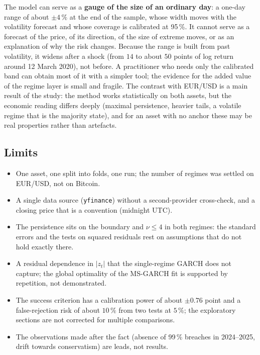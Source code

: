 \documentclass[12pt,a4paper]{article}
\begin{document}
\begin{econbox}
	The model can serve as a \textbf{gauge of the size of an ordinary day}: a one-day range of about $\pm4\,\%$ at the end of the sample, whose width moves with the volatility forecast and whose coverage is calibrated at 95\,\%. It cannot serve as a forecast of the price, of its direction, of the size of extreme moves, or as an explanation of why the risk changes. Because the range is built from past volatility, it widens after a shock (from $14$ to about $50$ points of log return around 12 March 2020), not before. A practitioner who needs only the calibrated band can obtain most of it with a simpler tool; the evidence for the added value of the regime layer is small and fragile. The contrast with EUR/USD is a main result of the study: the method works statistically on both assets, but the economic reading differs deeply (maximal persistence, heavier tails, a volatile regime that is the majority state), and for an asset with no anchor these may be real properties rather than artefacts.
\end{econbox}

\subsection{Limits}

\begin{itemize}
	\item One asset, one split into folds, one run; the number of regimes was settled on EUR/USD, not on Bitcoin.
	\item A single data source (\texttt{yfinance}) without a second-provider cross-check, and a closing price that is a convention (midnight UTC).
	\item The persistence sits on the boundary and $\nu\le4$ in both regimes: the standard errors and the tests on squared residuals rest on assumptions that do not hold exactly there.
	\item A residual dependence in $|z_t|$ that the single-regime GARCH does not capture; the global optimality of the MS-GARCH fit is supported by repetition, not demonstrated.
	\item The success criterion has a calibration power of about $\pm0.76$ point and a false-rejection risk of about $10\,\%$ from two tests at $5\,\%$; the exploratory sections are not corrected for multiple comparisons.
	\item The observations made after the fact (absence of 99\,\% breaches in 2024--2025, drift towards conservatism) are leads, not results.
\end{itemize}
\end{document}
